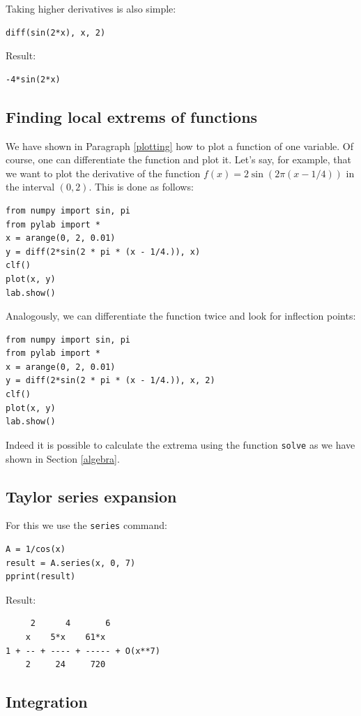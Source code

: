 \documentclass[article,A4,12pt]{llncs}
\begin{document}
Taking higher derivatives is also simple:
\begin{verbatim}
diff(sin(2*x), x, 2)
\end{verbatim}
Result:
\begin{verbatim}
-4*sin(2*x)
\end{verbatim}

\subsection{Finding local extrems of functions}

We have shown in Paragraph \ref{plotting} how to plot a function of one variable. 
Of course, one can differentiate the function and plot it. Let's say, for example, that 
we want to plot the derivative of the function $f(x) = 2\sin(2\pi(x - 1/4))$
in the interval $(0, 2)$. This is done as follows:
\begin{verbatim}
from numpy import sin, pi
from pylab import *
x = arange(0, 2, 0.01)
y = diff(2*sin(2 * pi * (x - 1/4.)), x)
clf()
plot(x, y)
lab.show()
\end{verbatim}
Analogously, we can differentiate the function twice and look for inflection points:
\begin{verbatim}
from numpy import sin, pi
from pylab import *
x = arange(0, 2, 0.01)
y = diff(2*sin(2 * pi * (x - 1/4.)), x, 2)
clf()
plot(x, y)
lab.show()
\end{verbatim}
Indeed it is possible to calculate the extrema using the function {\tt solve}
as we have shown in Section \ref{algebra}.

\subsection{Taylor series expansion}

For this we use the {\tt series} command:
\begin{verbatim}
A = 1/cos(x)
result = A.series(x, 0, 7)
pprint(result)
\end{verbatim}
Result:
\begin{verbatim}
     2      4       6          
    x    5*x    61*x           
1 + -- + ---- + ----- + O(x**7)
    2     24     720           
\end{verbatim}

\subsection{Integration}
\end{document}
